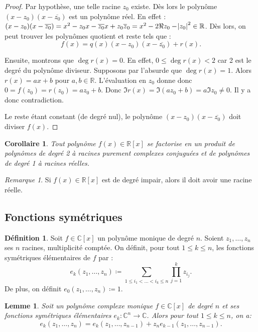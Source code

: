 \documentclass{article}
\newcommand{\R}{\mathbb R}
\newcommand{\C}{\mathbb C}
\newtheorem{cor}[thm]{Corollaire}
\newtheorem{lem}[thm]{Lemme}
\theoremstyle{definition}
\newtheorem{déf}[thm]{Définition}
\theoremstyle{remark}
\newtheorem*{rmq}{Remarque}
\begin{document}
		\begin{proof} Par hypothèse, une telle racine $z_0$ existe. Dès lors le polynôme $(x-z_0)(x-\overline {z_0})$ est un polynôme réel. En effet :
		$(x-z_0)(x-\overline {z_0}) = x^2 -z_0x - \overline {z_0}x + z_0\overline z_0 = x^2 - 2\Re z_0 - \abs{z_0}^2 \in \R$. Dès lors, on peut trouver les polynômes quotient
		et reste tels que : \[f(x) = q(x)(x-z_0)(x-\overline {z_0}) + r(x).\]
		
		Ensuite, montrons que $\deg r(x) = 0$. En effet, $0 \leq \deg r(x) < 2$ car 2 est le degré du polynôme diviseur. Supposons par l'absurde que $\deg r(x) = 1$. Alors
		$r(x) = ax+b$ pour $a, b \in \R$. L'évaluation en $z_0$ donne donc $0 = f(z_0) = r(z_0) = az_0+b$. Donc $\Im r(x) = \Im(az_0+b) = a\Im z_0 \neq 0$. Il y a donc
		contradiction.
		
		Le reste étant constant (de degré nul), le polynôme $(x-z_0)(x-\overline{z_0})$ doit diviser $f(x)$. \end{proof}

		\begin{cor} Tout polynôme $f(x) \in \R[x]$ se factorise en un produit de polynômes de degré 2 à racines purement complexes conjuguées et de polynômes de degré 1 à
		racines réelles. \end{cor}

		\begin{rmq} Si $f(x) \in \R[x]$ est de degré impair, alors il doit avoir une racine réelle. \end{rmq}

	\subsection{Fonctions symétriques}
		\begin{déf} Soit $f \in \C[x]$ un polynôme monique de degré $n$. Soient $z_1, \ldots, z_n$ ses $n$ racines, multiplicité comptée. On définit, pour tout
		$1 \leq k \leq n$, les fonctions symétriques élémentaires de $f$ par :\[e_k(z_1, \ldots, z_n) \coloneqq \sum_{1 \leq i_1 < \ldots < i_k \leq n}\prod_{j=1}^kz_{i_j}.\]
		De plus, on définit $e_0(z_1, \ldots, z_n) \coloneqq 1$. \end{déf}

		\begin{lem} Soit un polynôme complexe monique $f \in \C[x]$ de degré $n$ et ses fonctions symétriques élémentaires $e_k : \C^n \to \C$. Alors pour tout
		$1 \leq k \leq n$, on a: \[e_k(z_1, \ldots, z_n) = e_k(z_1, \ldots, z_{n-1}) + z_ne_{k-1}(z_1, \ldots, z_{n-1}).\]\end{lem}
\end{document}
